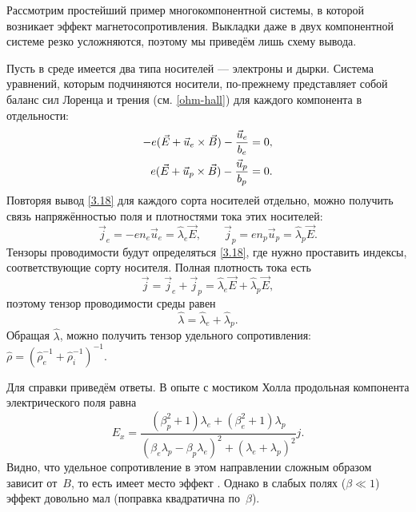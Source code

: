 \begin{lab:example}
Рассмотрим простейший пример многокомпонентной системы, в которой возникает
эффект магнетосопротивления. Выкладки даже в двух компонентной
системе резко усложняются, поэтому мы приведём лишь схему вывода.

Пусть в среде имеется два типа носителей --- электроны и дырки. Система
уравнений, которым подчиняются носители, по-прежнему представляет собой баланс
сил Лоренца и трения (см. \eqref{ohm-hall}) для каждого компонента в
отдельности:
\begin{equation}
    \eqmark{two-component}
    \begin{aligned}
-e(\vec{E}+\vec{u}_e\times \vec{B}) - \frac{\vec{u}_e}{b_e} &=0,\\
e(\vec{E}+\vec{u}_p\times \vec{B}) - \frac{\vec{u}_p}{b_p} &=0.
\end{aligned}
\end{equation}
Повторяя вывод \eqref{3.18} для каждого сорта носителей отдельно, можно
получить связь напряжённостью поля и плотностями тока этих носителей:
\begin{equation}
    \vec{j}_e = -en_e \vec{u}_e = \widehat{\lambda}_e \vec{E},\qquad
    \vec{j}_p = en_p \vec{u}_p = \widehat{\lambda}_p \vec{E}.
\end{equation}
Тензоры проводимости будут определяться \eqref{3.18}, где нужно проставить
индексы, соответствующие сорту носителя.
Полная плотность тока есть
\[
\vec{j} = \vec{j}_e + \vec{j}_p = \widehat{\lambda}_e \vec{E} +
\widehat{\lambda}_p \vec{E},
\]
поэтому тензор проводимости среды равен
\[
\widehat{\lambda} = \widehat{\lambda}_e + \widehat{\lambda}_p.
\]
Обращая $\widehat{\lambda}$, можно получить тензор удельного сопротивления:
$\widehat{\rho}=
\left(\widehat{\rho}_e^{-1}+\widehat{\rho}_i^{-1}\right)^{-1}$.

Для справки приведём ответы.
В опыте с мостиком Холла продольная компонента электрического поля равна
\[
E_x = \frac{(\beta_p^2+1) \lambda_e+ (\beta_e^2 +1)\lambda_p}%
{ (\beta_e \lambda_p-\beta_p \lambda_e)^2 + (\lambda_e+\lambda_p)^2}
j.
\]
Видно, что удельное сопротивление в этом направлении сложным образом
зависит от~$B$, то есть имеет место эффект .
Однако в слабых полях ($\beta \ll 1$) эффект довольно мал (поправка
квадратична по~$\beta$).


\end{lab:example}
